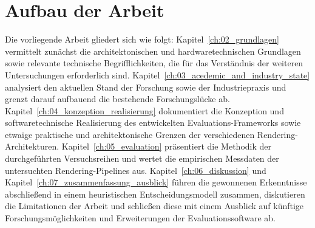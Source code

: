 \section{Aufbau der Arbeit}
\label{sec:0104_setup}

Die vorliegende Arbeit gliedert sich wie folgt:
Kapitel~\ref{ch:02_grundlagen} vermittelt zunächst die architektonischen und hardwaretechnischen Grundlagen sowie
relevante technische Begrifflichkeiten, die für das Verständnis der weiteren Untersuchungen erforderlich sind.
Kapitel~\ref{ch:03_acedemic_and_industry_state} analysiert den aktuellen Stand der Forschung sowie der Industriepraxis
und grenzt darauf aufbauend die bestehende Forschungslücke ab.
Kapitel~\ref{ch:04_konzeption_realisierung} dokumentiert die Konzeption und softwaretechnische Realisierung des
entwickelten
Evaluations-Frameworks sowie etwaige praktische und architektonische Grenzen der verschiedenen
Rendering-Architekturen.
Kapitel~\ref{ch:05_evaluation} präsentiert die Methodik der durchgeführten Versuchsreihen und wertet die
empirischen Messdaten der untersuchten Rendering-Pipelines aus.
Kapitel~\ref{ch:06_diskussion} und Kapitel~\ref{ch:07_zusammenfassung_ausblick} führen die gewonnenen Erkenntnisse
abschließend in einem heuristischen Entscheidungsmodell zusammen, diskutieren die Limitationen der Arbeit und
schließen diese mit einem Ausblick auf künftige Forschungsmöglichkeiten und Erweiterungen der Evaluationssoftware ab.
